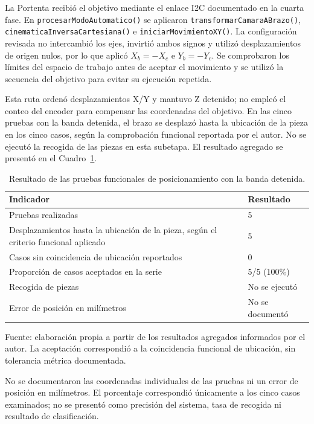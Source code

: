La Portenta recibió el objetivo mediante el enlace I2C documentado en la cuarta fase. En \texttt{procesarModoAutomatico()} se aplicaron \texttt{transformarCamaraABrazo()}, \texttt{cinematicaInversaCartesiana()} e \texttt{iniciarMovimientoXY()}. La configuración revisada no intercambió los ejes, invirtió ambos signos y utilizó desplazamientos de origen nulos, por lo que aplicó $X_b=-X_c$ e $Y_b=-Y_c$. Se comprobaron los límites del espacio de trabajo antes de aceptar el movimiento y se utilizó la secuencia del objetivo para evitar su ejecución repetida.

Esta ruta ordenó desplazamientos X/Y y mantuvo Z detenido; no empleó el conteo del encoder para compensar las coordenadas del objetivo. En las cinco pruebas con la banda detenida, el brazo se desplazó hasta la ubicación de la pieza en los cinco casos, según la comprobación funcional reportada por el autor. No se ejecutó la recogida de las piezas en esta subetapa. El resultado agregado se presentó en el Cuadro~\ref{tab:fase5_prueba_estatica}.

\begin{table}[H]
    \centering
    \caption{Resultado de las pruebas funcionales de posicionamiento con la banda detenida.}
    \label{tab:fase5_prueba_estatica}
    \begin{tabular}{p{}p{}}
        \hline
        Indicador & Resultado \\
        \hline
        Pruebas realizadas & 5 \\
        Desplazamientos hasta la ubicación de la pieza, según el criterio funcional aplicado & 5 \\
        Casos sin coincidencia de ubicación reportados & 0 \\
        Proporción de casos aceptados en la serie & 5/5 (100\%) \\
        Recogida de piezas & No se ejecutó \\
        Error de posición en milímetros & No se documentó \\
        \hline
    \end{tabular}
    \par\small\raggedright Fuente: elaboración propia a partir de los resultados agregados informados por el autor. La aceptación correspondió a la coincidencia funcional de ubicación, sin tolerancia métrica documentada.
\end{table}

No se documentaron las coordenadas individuales de las pruebas ni un error de posición en milímetros. El porcentaje correspondió únicamente a los cinco casos examinados; no se presentó como precisión del sistema, tasa de recogida ni resultado de clasificación.


